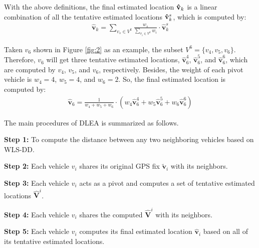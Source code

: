 \documentclass[letterpaper, 10 pt, conference]{ieeeconf}
\begin{document}
With the above definitions, the final estimated location ${\bf{\hat v}}_k $ is a linear combination of all the tentative estimated locations ${\bf{\hat v}}_k^s $, which is computed by:
\begin{eqnarray}
{\mathbf{\hat v}}_k  = \sum\limits_{v_s  \in V^k } {\frac{{w_s }}{{\sum\limits_{v_i  \in V^k } {w_i } }} \cdot {\mathbf{\hat v}}_k^s }
\end{eqnarray}


Taken  $v_6$ shown in Figure \ref{fig:2} as an example, the subset $V^6  = \{ v_4 ,v_5 ,v_6 \}$. Therefore, $v_6$ will get three tentative estimated locations, ${\mathbf{\hat v}}_6^4 $,  ${\mathbf{\hat v}}_6^5$, and ${\mathbf{\hat v}}_6^6 $, which are computed by $v_4$, $v_5$, and $v_6$, respectively. Besides, the weight of each pivot vehicle is $w_4=4$, $w_5=4$, and $w_6=2$. So, the final estimated location is computed by:
\begin{align*}
{\mathbf{\hat v}}_6  = \frac{1}{{w_4  + w_5  + w_6 }} \cdot (w_4 {\mathbf{\hat v}}_6^4  + w_5 {\mathbf{\hat v}}_6^5  + w_6 {\mathbf{\hat v}}_6^6 )
\end{align*}

The main procedures of  DLEA  is summarized as follows.

\textbf{Step 1:} To compute the distance between any two neighboring vehicles based on WLS-DD.

\vspace{0.3em}

\textbf{Step 2:} Each vehicle $v_i$ shares its original GPS fix ${\mathbf{\tilde v}}_i $ with its neighbors.

\vspace{0.3em}

\textbf{Step 3:} Each vehicle $v_i$ acts as a pivot and computes a set of tentative estimated locations ${\mathbf{\hat V}}^i $.

\vspace{0.3em}

\textbf{Step 4:} Each vehicle  $v_i$ shares the computed ${\mathbf{\hat V}}^i $ with its neighbors.

\vspace{0.3em}

\textbf{Step 5:} Each vehicle $v_i$  computes its final estimated location ${\mathbf{\hat v}}_i $ based on all of its tentative estimated locations.
\end{document}
